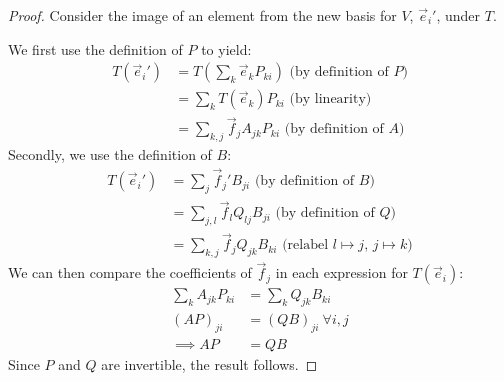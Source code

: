 \documentclass[../main.tex]{subfiles}
\begin{document}
\begin{proof}
  Consider the image of an element from the new basis for $V$, $\vec{e}_i'$, under $T$.

  We first use the definition of $P$ to yield:
  \begin{align*}
    T(\vec{e}_i') &= T\left(\sum_{k} \vec{e}_k P_{k i} \right) \text{ (by definition of $P$)} \\
                  &= \sum_{k} T(\vec{e}_k)P_{k i} \text{ (by linearity)} \\
                  &= \sum_{k, j} \vec{f}_j A_{j k} P_{k i}  \text{ (by definition of $A$)}
  \end{align*}
  Secondly, we use the definition of $B$:
  \begin{align*}
    T(\vec{e}_i') &= \sum_{j} \vec{f}_j' B_{j i} \text{ (by definition of $B$)}\\
                  &= \sum_{j, l} \vec{f}_l Q_{l j}B_{j i} \text{ (by definition of $Q$)}\\
                  &= \sum_{k, j} \vec{f}_j Q_{j k}B_{k i} \text{ (relabel $l \mapsto j$, $j \mapsto k$)}
  \end{align*}
  We can then compare the coefficients of $\vec{f}_j$ in each expression for $T(\vec{e}_i)$:
  \begin{align*}
    \sum_{k} A_{j k}P_{k i} &= \sum_{k} Q_{j k}B_{k i} \\
    (AP)_{j i} &= (QB)_{j i} \ \forall i, j \\
    \implies AP &= QB
  \end{align*}
  Since $P$ and $Q$ are invertible, the result follows.
\end{proof}
\end{document}
